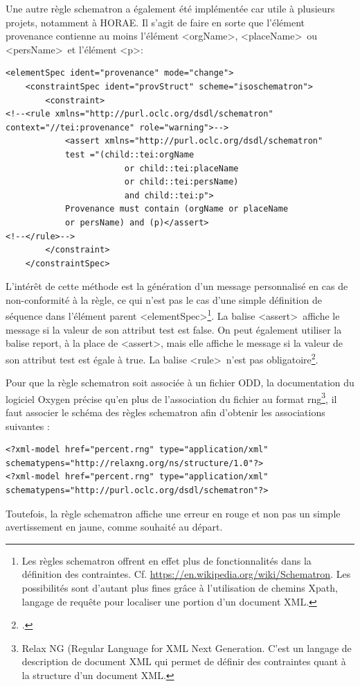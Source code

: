 \documentclass[a4paper,12pt,twoside]{book}
\begin{document}
Une autre règle schematron a également été implémentée car utile à plusieurs projets, notamment à HORAE. Il s'agit de faire en sorte que l’élément provenance contienne au moins l’élément \textless orgName\textgreater, \textless placeName\textgreater~ou \textless persName\textgreater~et l’élément \textless p\textgreater  : 
\begin{verbatim}
<elementSpec ident="provenance" mode="change">
    <constraintSpec ident="provStruct" scheme="isoschematron">
        <constraint>
<!--<rule xmlns="http://purl.oclc.org/dsdl/schematron" 
context="//tei:provenance" role="warning">-->
            <assert xmlns="http://purl.oclc.org/dsdl/schematron"
            test ="(child::tei:orgName
                        or child::tei:placeName
                        or child::tei:persName)
                        and child::tei:p">
            Provenance must contain (orgName or placeName 
            or persName) and (p)</assert>
<!--</rule>-->
        </constraint>
    </constraintSpec>
\end{verbatim}
L’intérêt de cette méthode est la génération d'un message personnalisé en cas de non-conformité à la règle, ce qui n'est pas le cas d’une simple définition de séquence dans l'élément parent \textless elementSpec\textgreater \footnote{Les règles schematron offrent en effet plus de fonctionnalités dans la définition des contraintes. Cf. \url{https://en.wikipedia.org/wiki/Schematron}. Les possibilités sont d'autant plus fines grâce à l'utilisation de chemins Xpath, langage de requête pour localiser une portion d'un document XML.}. La balise \textless assert\textgreater~affiche le message si la valeur de son attribut test est \og false\fg{}. On peut également utiliser la balise report, à la place de \textless assert\textgreater, mais elle affiche le message si la valeur de son attribut test est égale à \og true\fg{}. La balise \textless rule\textgreater~n’est pas obligatoire\footcite{Intro_schematron}. 

Pour que la règle schematron soit associée à un fichier ODD, la documentation du logiciel Oxygen précise qu’en plus de l’association du fichier au format rng\footnote{Relax NG (Regular Language for XML Next Generation. C'est un langage de description de document XML qui permet de définir des contraintes quant à la structure d'un document XML.}, il faut associer le schéma des règles schematron afin d'obtenir les associations suivantes :
\begin{verbatim}
<?xml-model href="percent.rng" type="application/xml" 
schematypens="http://relaxng.org/ns/structure/1.0"?>
<?xml-model href="percent.rng" type="application/xml" 
schematypens="http://purl.oclc.org/dsdl/schematron"?> 
\end{verbatim}
Toutefois, la règle schematron affiche une erreur en rouge et non pas un simple avertissement en jaune, comme souhaité au départ. \\
\end{document}
